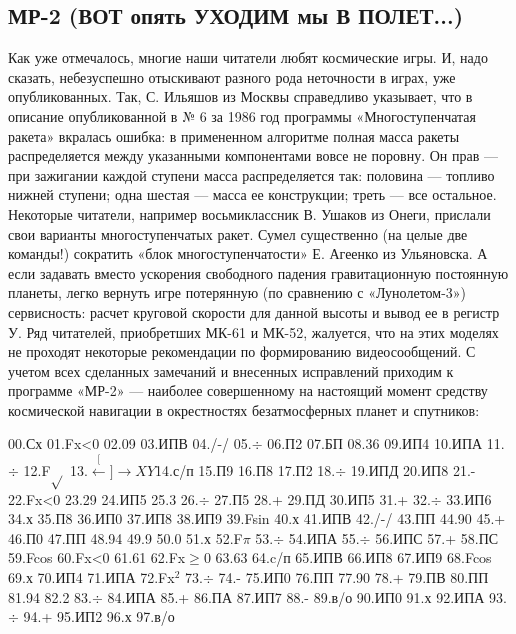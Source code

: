 \documentclass[11pt,a4paper,oneside]{article}
\def\XY{$\stackrel[\leftarrow]{\rightarrow}{XY}$}
\begin{document}
\subsection{МР-2 (ВОТ опять УХОДИМ мы В ПОЛЕТ...)}
Как уже отмечалось, многие наши читатели любят космические игры. И, надо сказать, небезуспешно отыскивают разного рода неточности в играх, уже опубликованных. Так, С. Ильяшов из Москвы справедливо указывает, что в описание опубликованной в № 6 за 1986 год программы «Многоступенчатая ракета» вкралась ошибка: в примененном алгоритме полная масса ракеты распределяется между указанными компонентами вовсе не поровну. Он прав — при зажигании каждой ступени масса распределяется так: половина — топливо нижней ступени; одна шестая — масса ее конструкции; треть — все остальное. Некоторые читатели, например восьмиклассник В. Ушаков из Онеги, прислали свои варианты многоступенчатых ракет. Сумел существенно (на целые две команды!) сократить «блок многоступенчатости» Е. Агеенко из Ульяновска. А если задавать вместо ускорения свободного падения гравитационную постоянную планеты, легко вернуть игре потерянную (по сравнению с «Лунолетом-3») сервисность: расчет круговой скорости для данной высоты и вывод ее в регистр У. Ряд читателей, приобретших МК-61 и МК-52, жалуется, что на этих моделях не проходят некоторые рекомендации по формированию видеосообщений. С учетом всех сделанных замечаний и внесенных исправлений приходим к программе «МР-2» — наиболее совершенному на настоящий момент средству космической навигации в окрестностях безатмосферных планет и спутников:

00.Сх 01.Fx<0 02.09 03.ИПВ 04./-/ 05.$\div$ 06.П2 07.БП 08.36 09.ИП4 10.ИПА 11.$\div$ 12.F$\sqrt{}$ 13.\XY 14.с/п 15.П9
16.П8 17.П2 18.$\div$ 19.ИПД 20.ИП8 21.- 22.Fx<0 23.29 24.ИП5 25.3 26.$\div$ 27.П5 28.+ 29.ПД 30.ИП5 31.+ 32.$\div$ 33.ИП6 34.х 35.П8 36.ИП0 37.ИП8 38.ИП9 39.Fsin 40.х 41.ИПВ 42./-/ 43.ПП 44.90 45.+ 46.П0
47.ПП 48.94 49.9 50.0 51.х 52.F$\pi$ 53.$\div$ 54.ИПА 55.$\div$ 56.ИПС 57.+ 58.ПС 59.Fcos 60.Fx<0 61.61 62.Fx$\geq$0 63.63 64.c/п 65.ИПВ 66.ИП8 67.ИП9 68.Fcos 69.х 70.ИП4 71.ИПА 72.Fx$^{2}$ 73.$\div$ 74.- 75.ИП0 76.ПП 77.90 78.+ 79.ПВ 80.ПП 81.94 82.2 83.$\div$ 84.ИПА 85.+ 86.ПА 87.ИП7 88.- 89.в/о 90.ИП0 91.х 92.ИПА
93.$\div$ 94.+ 95.ИП2 96.х 97.в/о
\end{document}
